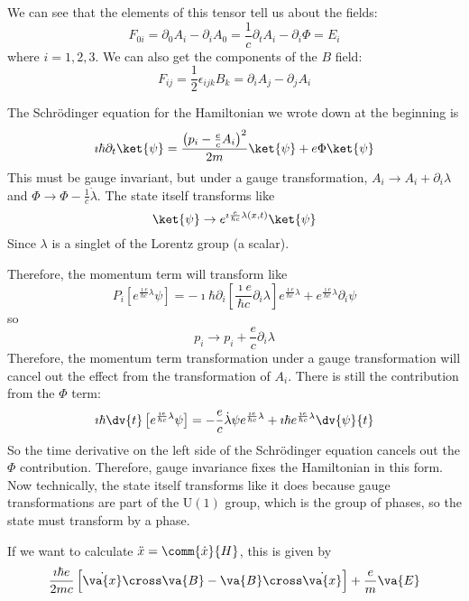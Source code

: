 \documentclass[a4paper,twoside,master.tex]{subfiles}
\begin{document}
We can see that the elements of this tensor tell us about the fields:
\begin{equation}
    F_{0i} = \partial_{0} A_{i} - \partial_i A_0 = \frac{1}{c} \partial_t A_i - \partial_{i} \Phi = E_i
\end{equation}
where $ i = 1,2,3 $.
We can also get the components of the $ B $ field:
\begin{equation}
    F_{ij} = \frac{1}{2} \epsilon_{ijk} B_k = \partial_i A_j - \partial_j A_i
\end{equation}

The Schr\"odinger equation for the Hamiltonian we wrote down at the beginning is
\begin{equation}
    \imath \hbar \partial_t\ket{\psi} = \frac{\left( p_i - \frac{e}{c} A_i \right)^2}{2m}\ket{\psi} + e \Phi\ket{\psi}
\end{equation}
This must be gauge invariant, but under a gauge transformation, $ A_i \to A_i + \partial_i \lambda $ and $ \Phi \to \Phi - \frac{1}{c} \dot{\lambda} $. The state itself transforms like
\begin{equation}
    \ket{\psi} \to e^{\imath \frac{e}{\hbar c} \lambda(x,t)}\ket{\psi}
\end{equation}
Since $ \lambda $ is a singlet of the Lorentz group (a scalar).

Therefore, the momentum term will transform like
\begin{equation}
    P_i \left[ e^{\frac{\imath e}{\hbar c} \lambda} \psi \right] = - \imath \hbar \partial_i \left[ \frac{\imath e}{\hbar c} \partial_i \lambda \right] e^{\frac{\imath e}{\hbar c} \lambda} + e^{\frac{\imath e}{\hbar c} \lambda} \partial_i \psi
\end{equation}
so
\begin{equation}
    p_i \to p_i + \frac{e}{c} \partial_i \lambda 
\end{equation}
Therefore, the momentum term transformation under a gauge transformation will cancel out the effect from the transformation of $ A_i $. There is still the contribution from the $ \Phi $ term:
\begin{equation}
    \imath \hbar \dv{t}\left[ e^{\frac{\imath e}{\hbar c} \lambda} \psi \right] = - \frac{e}{c} \dot{\lambda} \psi e^{\frac{\imath e}{\hbar c} \lambda} + \imath \hbar e^{\frac{\imath e}{\hbar c} \lambda} \dv{\psi}{t}
\end{equation}
So the time derivative on the left side of the Schr\"odinger equation cancels out the $ \Phi $ contribution. Therefore, gauge invariance fixes the Hamiltonian in this form. Now technically, the state itself transforms like it does because gauge transformations are part of the $ \text{U}(1) $ group, which is the group of phases, so the state must transform by a phase.


If we want to calculate $ \ddot{x} = \comm{\dot{x}}{H} $, this is given by
\begin{equation}
    \frac{\imath \hbar e}{2mc} \left[ \dot{\va{x}} \cross \va{B} - \va{B} \cross \dot{\va{x}} \right] + \frac{e}{m} \va{E}
\end{equation}
\end{document}
